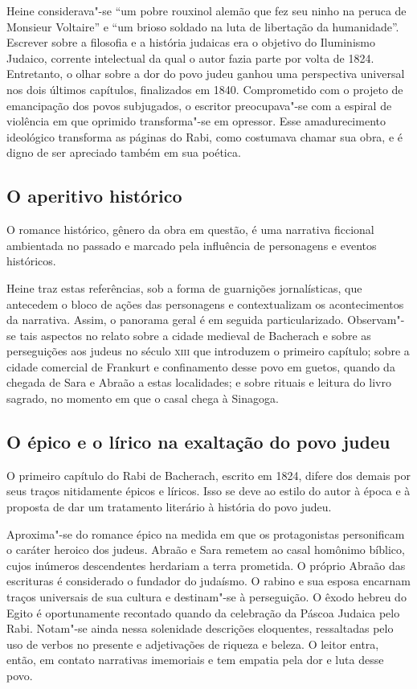 \documentclass[12pt]{extarticle}
\begin{document}
Heine considerava"-se ``um pobre rouxinol alemão que fez seu ninho na
peruca de Monsieur Voltaire'' e ``um brioso soldado na luta de
libertação da humanidade''. Escrever sobre a filosofia e a história
judaicas era o objetivo do Iluminismo Judaico, corrente intelectual da
qual o autor fazia parte por volta de 1824. Entretanto, o olhar sobre a
dor do povo judeu ganhou uma perspectiva universal nos dois últimos
capítulos, finalizados em 1840. Comprometido com o projeto de
emancipação dos povos subjugados, o escritor preocupava"-se com a espiral
de violência em que oprimido transforma"-se em opressor. Esse
amadurecimento ideológico transforma as páginas do Rabi, como costumava
chamar sua obra, e é digno de ser apreciado também em sua poética.




\subsection{O aperitivo histórico}

O romance histórico, gênero da obra em questão, é uma narrativa
ficcional ambientada no passado e marcado pela influência de personagens
e eventos históricos.

Heine traz estas referências, sob a forma de guarnições jornalísticas,
que antecedem o bloco de ações das personagens e contextualizam os
acontecimentos da narrativa. Assim, o panorama geral é em seguida
particularizado. Observam"-se tais aspectos no relato sobre a cidade
medieval de Bacherach e sobre as perseguições aos judeus no século \textsc{xiii}
que introduzem o primeiro capítulo; sobre a cidade comercial de Frankurt
e confinamento desse povo em guetos, quando da chegada de Sara e Abraão
a estas localidades; e sobre rituais e leitura do livro sagrado, no
momento em que o casal chega à Sinagoga.

\subsection{O épico e o lírico na exaltação do povo judeu}

O primeiro capítulo do Rabi de Bacherach, escrito em 1824, difere dos
demais por seus traços nitidamente épicos e líricos. Isso se deve ao
estilo do autor à época e à proposta de dar um tratamento literário à
história do povo judeu.

Aproxima"-se do romance épico na medida em que os protagonistas
personificam o caráter heroico dos judeus. Abraão e Sara remetem ao
casal homônimo bíblico, cujos inúmeros descendentes herdariam a terra
prometida. O próprio Abraão das escrituras é considerado o fundador do
judaísmo. O rabino e sua esposa encarnam traços universais de sua
cultura e destinam"-se à perseguição. O êxodo hebreu do Egito é
oportunamente recontado quando da celebração da Páscoa Judaica pelo
Rabi. Notam"-se ainda nessa solenidade descrições eloquentes, ressaltadas
pelo uso de verbos no presente e adjetivações de riqueza e beleza. O
leitor entra, então, em contato narrativas imemoriais e tem empatia pela
dor e luta desse povo.
\end{document}
